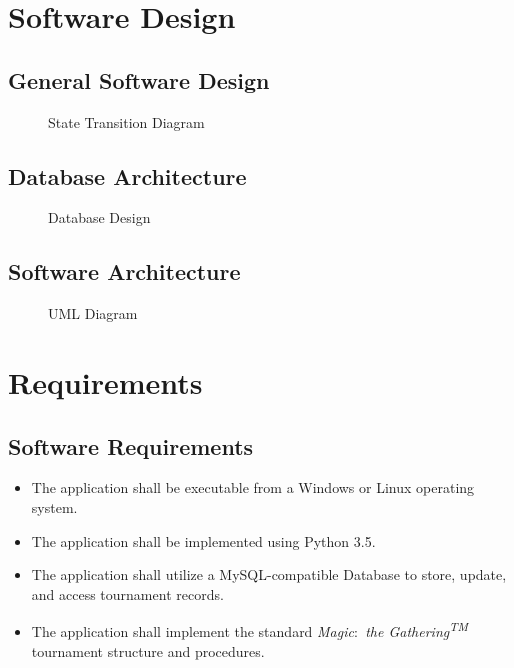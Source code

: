 \documentclass[11pt]{article}
\newcommand{\mtg}{\textit{Magic$\colon$ the Gathering\textsuperscript{TM}} }
\begin{document}
    \newpage

    \section{Software Design}
    \subsection{General Software Design}
    \begin{figure}[H]
        \centering
        \caption{State Transition Diagram}
    \end{figure}
    \subsection{Database Architecture}
    \begin{figure}[H]
        \centering
        \caption{Database Design}
    \end{figure}
    \subsection{Software Architecture}
     \begin{figure}[H]
        \centering
        \caption{UML Diagram}
    \end{figure}

    \newpage

    \section{Requirements}
    \subsection{Software Requirements}
    \begin{itemize}
        \item The application shall be executable from a Windows or Linux operating system.
        \item The application shall be implemented using Python 3.5.
        \item The application shall utilize a MySQL-compatible Database to store, update, and access tournament records.
        \item The application shall implement the standard \mtg tournament structure and procedures.
    \end{itemize}
\end{document}
